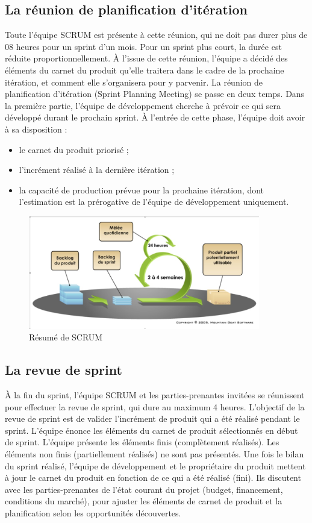 \documentclass[a4paper,12pt]{book}
\theoremstyle{break}
\begin{document}
\subsection{La réunion de planification d'itération}
Toute l'équipe SCRUM est présente à cette réunion, qui ne doit pas durer plus de 08 heures pour un sprint d'un mois. Pour un sprint plus court, la durée est réduite proportionnellement. À l'issue de cette réunion, l'équipe a décidé des éléments du carnet du produit qu'elle traitera dans le cadre de la prochaine itération, et comment elle s'organisera pour y parvenir.
La réunion de planification d'itération (Sprint Planning Meeting) se passe en deux temps. Dans la première partie, l'équipe de développement cherche à prévoir ce qui sera développé durant le prochain sprint. À l'entrée de cette phase, l'équipe doit avoir à sa disposition :
\begin{itemize}
    \item le carnet du produit priorisé ;
    \item l'incrément réalisé à la dernière itération ;
    \item la capacité de production prévue pour la prochaine itération, dont l'estimation est la prérogative de l'équipe de développement uniquement.
\end{itemize}

\begin{figure}[h!]
    \centering
    \includegraphics[width=0.9\textwidth]{scrum}
    \caption{Résumé de SCRUM}
    \label{fig:scrum}
\end{figure}

\subsection{La revue de sprint}
À la fin du sprint, l'équipe SCRUM et les parties-prenantes invitées se réunissent pour effectuer la revue de sprint, qui dure au maximum 4 heures. L'objectif de la revue de sprint est de valider l'incrément de produit qui a 
été réalisé pendant le sprint. L'équipe énonce les éléments du carnet de produit sélectionnés en début de sprint. L'équipe présente les éléments finis (complètement réalisés). Les éléments non finis (partiellement réalisés) ne sont pas présentés.
Une fois le bilan du sprint réalisé, l'équipe de développement et le propriétaire du produit mettent à jour le carnet du produit en fonction de ce qui a été réalisé (fini). Ils discutent avec les parties-prenantes de l'état courant du projet (budget, financement, conditions du marché), pour ajuster les éléments de carnet de produit et la planification selon les opportunités découvertes.
\end{document}
